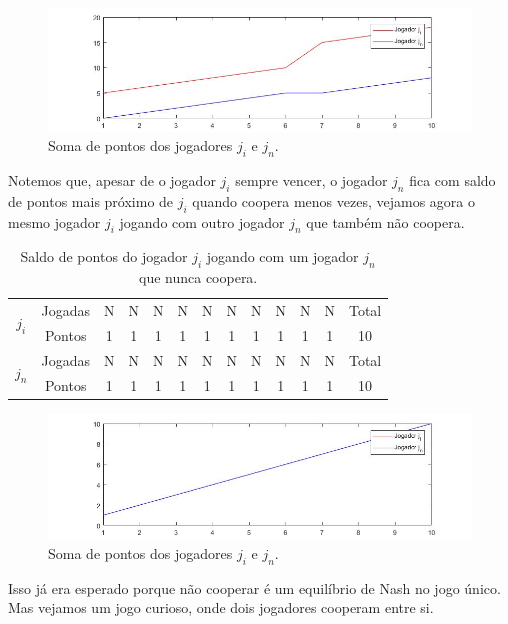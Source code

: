 \begin{figure}[H]
\centering
\includegraphics[width=14cm]{imagens/graf2.jpg}
\caption{Soma de pontos dos jogadores $j_i$ e $j_n$.}
\label{fig2}
\end{figure}

Notemos que, apesar de o jogador $j_i$ sempre vencer, o jogador $j_n$ fica com saldo de pontos mais próximo de $j_i$ quando coopera menos vezes, vejamos agora o mesmo jogador $j_i$ jogando com outro jogador $j_n$ que também não coopera.

\begin{table}[H]
\centering
\begin{tabular}{|c|c|c|c|c|c|c|c|c|c|c|c|c|}\hline
\multirow{2}{*}{$j_i$} & Jogadas & N & N & N & N & N & N & N & N &	N &	N & Total\\\cline{2-12}
 & Pontos & 1 & 1 & 1 & 1 & 1 & 1 & 1 & 1 & 1 & 1 & 10\\\hline\hline
\multirow{2}{*}{$j_n$} & Jogadas & N & N & N & N & N & N & N & N &	N &	N & Total\\\cline{2-12}
 & Pontos & 1 & 1 & 1 & 1 & 1 & 1 & 1 & 1 & 1 & 1 & 10\\\hline
\end{tabular}
\caption{Saldo de pontos do jogador $j_i$ jogando com um jogador $j_n$ que nunca coopera.}
\label{tab3}
\end{table}

\begin{figure}[H]
\centering
\includegraphics[width=14cm]{imagens/graf3.jpg}
\caption{Soma de pontos dos jogadores $j_i$ e $j_n$.}
\label{fig3}
\end{figure}

Isso já era esperado porque não cooperar é um equilíbrio de Nash no jogo único. Mas vejamos um jogo curioso, onde dois jogadores cooperam entre si.

